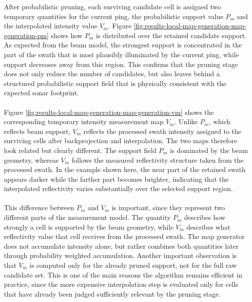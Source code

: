 \noindent
After probabilistic pruning, each surviving candidate cell is assigned two temporary quantities for the current ping, the probabilistic support value $P_m$ and the interpolated intensity value $V_m$. Figure \ref{fig:results-local-map-generation-map-generation-pm} shows how $P_m$ is distributed over the retained candidate support. As expected from the beam model, the strongest support is concentrated in the part of the swath that is most plausibly illuminated by the current ping, while support decreases away from this region. This confirms that the pruning stage does not only reduce the number of candidates, but also leaves behind a structured probabilistic support field that is physically consistent with the expected sonar footprint.
\\ \\
Figure \ref{fig:results-local-map-generation-map-generation-vm} shows the corresponding temporary intensity measurement map $V_m$. Unlike $P_m$, which reflects beam support, $V_m$ reflects the processed swath intensity assigned to the surviving cells after backprojection and interpolation. The two maps therefore look related but clearly different. The support field $P_m$ is dominated by the beam geometry, whereas $V_m$ follows the measured reflectivity structure taken from the processed swath. In the example shown here, the near part of the retained swath appears darker while the farther part becomes brighter, indicating that the interpolated reflectivity varies substantially over the selected support region.
\\ \\
This difference between $P_m$ and $V_m$ is important, since they represent two different parts of the measurement model. The quantity $P_m$ describes how strongly a cell is supported by the beam geometry, while $V_m$ describes what reflectivity value that cell receives from the processed swath. The map generator does not accumulate intensity alone, but rather combines both quantities later through probability weighted accumulation. Another important observation is that $V_m$ is computed only for the already pruned support, not for the full raw candidate set. This is one of the main reasons the algorithm remains efficient in practice, since the more expensive interpolation step is evaluated only for cells that have already been judged sufficiently relevant by the pruning stage.

\newpage

